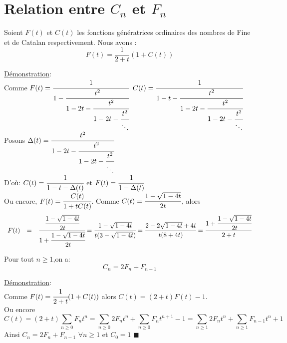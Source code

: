 	\section{Relation entre $C_{n}$ et $F_{n}$}
		\begin{proposition}
			Soient $F(t)$ et $C(t)$ les fonctions génératrices ordinaires des nombres de Fine et de Catalan respectivement. Nous avons :
			\[
			F(t)=\frac{1}{2+t}(1+C(t))
			\]
		\end{proposition}
		\underline{Démonstration}:\\
			Comme $F(t)=\cfrac{1}{1-\cfrac{t^2}{1-2t-\cfrac{t^2}{1-2t-\cfrac{t^2}{\ddots}}}}$  $C(t)=\cfrac{1}{1-t-\cfrac{t^2}{1-2t-\cfrac{t^2}{1-2t-\cfrac{t^2}{\ddots}}}}$\\
			Posons $\Delta(t)=\cfrac{t^2}{1-2t-\cfrac{t^2}{1-2t-\cfrac{t^2}{\ddots}}}$\\
			D'où: $C(t)=\cfrac{1}{1-t-\Delta(t)}$ et $F(t)=\cfrac{1}{1-\Delta(t)} $\\
			Ou encore, $F(t)=\cfrac{C(t)}{1+tC(t)} $. Comme $C(t)=\cfrac{1-\sqrt{1-4t}}{2t}$, alors 
			\[
			\begin{array} {c c l}
				F(t) &=&\cfrac{\cfrac{1-\sqrt{1-4t}}{2t}}{1+\cfrac{1-\sqrt{1-4t}}{2t}} =\cfrac{1-\sqrt{1-4t}}{t(3-\sqrt{1-4t})}=\cfrac{2-2\sqrt{1-4t}+4t}{t(8+4t)}=\cfrac{1+\cfrac{1-\sqrt{1-4t}}{2t}}{2+t}

			\end{array}
			\]
		\begin{proposition}
			Pour tout $n\geq 1$,on a:\[C_{n}=2F_{n}+F_{n-1}\]
		\end{proposition}
		\underline{Démonstration}:\\
		Comme $F(t)=\cfrac{1}{2+t}(1+C(t))$ alors $C(t)=(2+t)F(t)-1$.\\Ou encore
		\[C(t)= (2+t)\underset{n\geq0}{\sum}F_{n}t^n =\sum_{n\geq 0}2F_{n}t^n+\sum_{n\geq 0} F_{n}t^{n+1}-1=\sum_{n\geq 1}2F_{n}t^n+\sum_{n\geq 1} F_{n-1}t^{n}+1\]
		Ainsi 
		$C_{n}=2F_{n}+F_{n-1}$ $\forall n\geq1$ et $C_{0}=1$  $\blacksquare$

